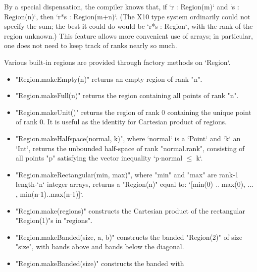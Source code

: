 By a special dispensation, the compiler knows that, if \xcd`r : Region(m)` and
\xcd`s : Region(n)`, then \xcd`r*s : Region(m+n)`.  (The X10 type system
ordinarily could not specify the sum; the best it could do 
would be \xcd`r*s : Region`, with the rank of the region unknown.)  This
feature allows more convenient use of arrays; in particular, one does not need
to keep track of ranks nearly so much.

Various built-in regions are provided through  factory
methods on \xcd`Region`.  
\begin{itemize}
\item \xcd"Region.makeEmpty(n)" returns an empty region of rank \xcd"n".
\item \xcd"Region.makeFull(n)" returns the region containing all points of
      rank \xcd"n".  
\item \xcd"Region.makeUnit()" returns the region of rank 0 containing the
      unique point of rank 0.  It is useful as the identity for Cartesian
      product of regions.
\item \xcd"Region.makeHalfspace(normal, k)",
      where \xcd`normal` is a \xcd`Point` and \xcd`k` an \xcd`Int`, 
      returns the unbounded
      half-space of rank \xcd"normal.rank", consisting of all points \xcd"p"
      satisfying the vector inequality \xcdmath`p$\cdot$normal $\le$ k`.
\item \xcd"Region.makeRectangular(min, max)", 
      where \xcd"min" and \xcd"max"
      are rank-1 length-\xcd`n` integer arrays, returns a
      \xcd"Region(n)" equal to: 
      \xcdmath`[min(0) .. max(0), $\ldots$, min(n-1)..max(n-1)]`.
\item \xcd"Region.make(regions)" constructs the Cartesian product of the
      rectangular \xcd"Region(1)"s in \xcd"regions".
\item \xcd"Region.makeBanded(size, a, b)" constructs the
      banded \xcd"Region(2)" of size \xcd"size", with  bands above
      and  bands below the diagonal.
\item \xcd"Region.makeBanded(size)" constructs the banded  with

\end{itemize}
